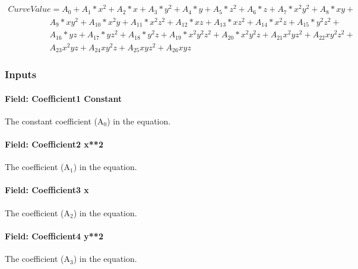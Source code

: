 \begin{equation}
  \begin{array}{l}
    CurveValue = {A_0} + {A_1}*{x^2} + {A_2}*x + {A_3}*{y^2} + {A_4}*y + {A_5}*{z^2} + {A_6}*z + {A_7}*{x^2}{y^2} + {A_8}*xy + \\
    \quad \quad \quad \quad \quad {A_9}*x{y^2} + {A_{10}}*{x^2}y + {A_{11}}*{x^2}{z^2} + {A_{12}}*xz + {A_{13}}*x{z^2} + {A_{14}}*{x^2}z + {A_{15}}*{y^2}{z^2} + \\
    \quad \quad \quad \quad \quad {A_{16}}*yz + {A_{17}}*y{z^2} + {A_{18}}*{y^2}z + {A_{19}}*{x^2}{y^2}{z^2} + {A_{20}}*{x^2}{y^2}z + {A_{21}}{x^2}y{z^2} + {A_{22}}x{y^2}{z^2} + \\
    \quad \quad \quad \quad \quad {A_{23}}{x^2}yz + {A_{24}}x{y^2}z + {A_{25}}xy{z^2} + {A_{26}}xyz
  \end{array}
\end{equation}

\subsubsection{Inputs}\label{inputs-10-011}

\paragraph{Field: Coefficient1 Constant}\label{field-coefficient1-constant-10}

The constant coefficient (A\(_{0}\)) in the equation.

\paragraph{Field: Coefficient2 x**2}\label{field-coefficient2-x2}

The coefficient (A\(_{1}\)) in the equation.

\paragraph{Field: Coefficient3 x}\label{field-coefficient3-x-1}

The coefficient (A\(_{2}\)) in the equation.

\paragraph{Field: Coefficient4 y**2}\label{field-coefficient4-y2}

The coefficient (A\(_{3}\)) in the equation.

